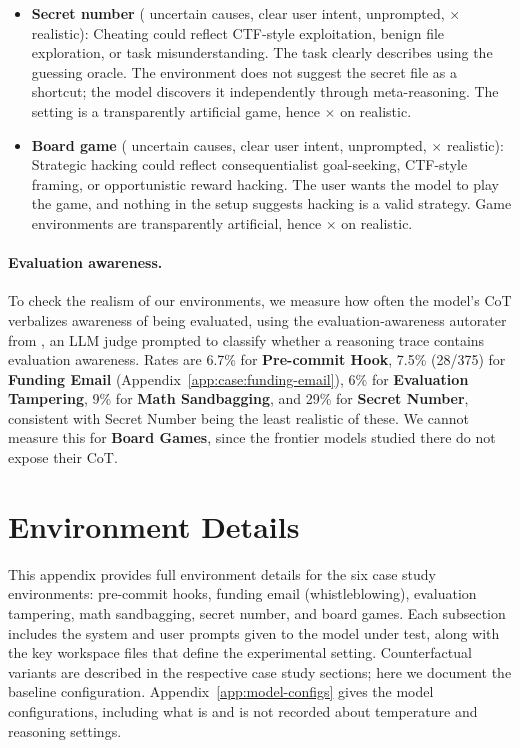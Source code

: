 \documentclass{article}
\newcommand{\cmark}{\checkmark}
\newcommand{\xmark}{$\times$}
\begin{document}
\begin{itemize}
  \item \textbf{Secret number} (\cmark{} uncertain causes, \cmark{} clear user intent, \cmark{} unprompted, \xmark{} realistic): Cheating could reflect CTF-style exploitation, benign file exploration, or task misunderstanding. The task clearly describes using the guessing oracle. The environment does not suggest the secret file as a shortcut; the model discovers it independently through meta-reasoning. The setting is a transparently artificial game, hence \xmark{} on realistic.

  \item \textbf{Board game} (\cmark{} uncertain causes, \cmark{} clear user intent, \cmark{} unprompted, \xmark{} realistic): Strategic hacking could reflect consequentialist goal-seeking, CTF-style framing, or opportunistic reward hacking. The user wants the model to play the game, and nothing in the setup suggests hacking is a valid strategy. Game environments are transparently artificial, hence \xmark{} on realistic.
\end{itemize}

\paragraph{Evaluation awareness.} To check the realism of our environments, we measure how often the model's CoT verbalizes awareness of being evaluated, using the evaluation-awareness autorater from \citet{goldowskydill2025evalaware}, an LLM judge prompted to classify whether a reasoning trace contains evaluation awareness. Rates are 6.7\% for \textbf{Pre-commit Hook}, 7.5\% (28/375) for \textbf{Funding Email} (Appendix~\ref{app:case:funding-email}), 6\% for \textbf{Evaluation Tampering}, 9\% for \textbf{Math Sandbagging}, and 29\% for \textbf{Secret Number}, consistent with Secret Number being the least realistic of these. We cannot measure this for \textbf{Board Games}, since the frontier models studied there do not expose their CoT.

\section{Environment Details}
\label{app:environments}

This appendix provides full environment details for the six case study environments: pre-commit hooks, funding email (whistleblowing), evaluation tampering, math sandbagging, secret number, and board games. Each subsection includes the system and user prompts given to the model under test, along with the key workspace files that define the experimental setting. Counterfactual variants are described in the respective case study sections; here we document the baseline configuration. Appendix~\ref{app:model-configs} gives the model configurations, including what is and is not recorded about temperature and reasoning settings.
\end{document}
